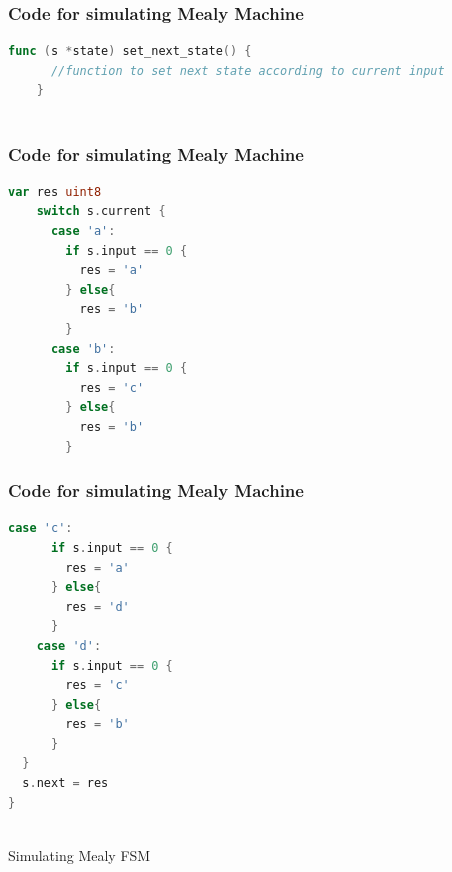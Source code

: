 \documentclass[xcolor=table]{beamer}
\begin{document}
  \begin{frame}[fragile]
  \frametitle{Code for simulating Mealy Machine}
  \begin{lstlisting}[language=go,keywordstyle=\bf,stringstyle=\it]
    func (s *state) set_next_state() {
      //function to set next state according to current input
    }
    
  \end{lstlisting}

\end{frame} 

\begin{frame}[fragile]
  \frametitle{Code for simulating Mealy Machine}
\begin{lstlisting}[language=go,keywordstyle=\bf,stringstyle=\it]
    var res uint8 
    switch s.current {
      case 'a':
        if s.input == 0 {
          res = 'a'
        } else{
          res = 'b'
        }
      case 'b':
        if s.input == 0 {
          res = 'c'
        } else{
          res = 'b'
        }

\end{lstlisting}
\end{frame}

\begin{frame}[fragile]
  \frametitle{Code for simulating Mealy Machine}
\begin{lstlisting}[language=go,keywordstyle=\bf,stringstyle=\it]
    case 'c':
      if s.input == 0 {
        res = 'a'
      } else{
        res = 'd'
      }
    case 'd':
      if s.input == 0 {
        res = 'c'
      } else{
        res = 'b'
      }
  }
  s.next = res
}
  
  \end{lstlisting}
\end{frame}


\begin{frame}{Simulating Mealy FSM}
\end{frame}
\end{document}
